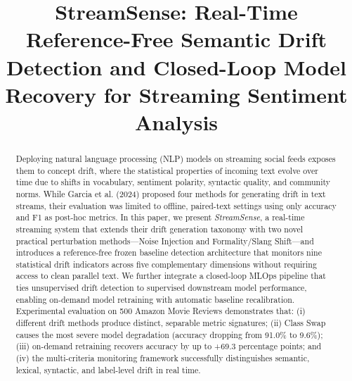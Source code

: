 \documentclass[conference]{IEEEtran}
\begin{document}
\title{StreamSense: Real-Time Reference-Free Semantic Drift Detection and Closed-Loop Model Recovery for Streaming Sentiment Analysis}

\author{
}

\maketitle

\begin{abstract}
Deploying natural language processing (NLP) models on streaming social feeds exposes them to concept drift, where the statistical properties of incoming text evolve over time due to shifts in vocabulary, sentiment polarity, syntactic quality, and community norms. While Garcia et al. (2024) proposed four methods for generating drift in text streams, their evaluation was limited to offline, paired-text settings using only accuracy and F1 as post-hoc metrics. In this paper, we present \textit{StreamSense}, a real-time streaming system that extends their drift generation taxonomy with two novel practical perturbation methods---Noise Injection and Formality/Slang Shift---and introduces a reference-free frozen baseline detection architecture that monitors nine statistical drift indicators across five complementary dimensions without requiring access to clean parallel text. We further integrate a closed-loop MLOps pipeline that ties unsupervised drift detection to supervised downstream model performance, enabling on-demand model retraining with automatic baseline recalibration. Experimental evaluation on 500 Amazon Movie Reviews demonstrates that: (i) different drift methods produce distinct, separable metric signatures; (ii) Class Swap causes the most severe model degradation (accuracy dropping from 91.0\% to 9.6\%); (iii) on-demand retraining recovers accuracy by up to +69.3 percentage points; and (iv) the multi-criteria monitoring framework successfully distinguishes semantic, lexical, syntactic, and label-level drift in real time.
\end{abstract}
\end{document}
